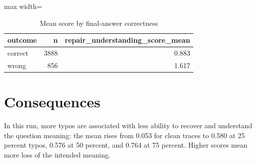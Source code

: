 \documentclass[11pt]{article}
\begin{document}
\begin{table}[H]
\centering
\caption{Mean score by final-answer correctness}
\small
\begin{adjustbox}{max width=\textwidth}
\begin{tabular}{lrr}
\toprule
\textbf{outcome} & \textbf{n} & \textbf{repair\_understanding\_score\_mean} \\
\midrule
correct & 3888 & 0.883 \\
wrong & 856 & 1.617 \\
\bottomrule
\end{tabular}
\end{adjustbox}
\end{table}

\section*{Consequences} In this run, more typos are associated with less ability to recover and understand the question meaning: the mean rises from 0.053 for clean traces to 0.580 at 25 percent typos, 0.576 at 50 percent, and 0.764 at 75 percent. Higher scores mean more loss of the intended meaning.
\end{document}
